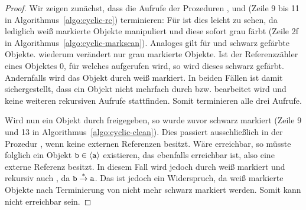 \begin{proof}
	Wir zeigen zunächst, dass die Aufrufe der Prozeduren ,  und  (Zeile 9 bis 11 in Algorithmus~\ref{algo:cyclic-rc}) terminieren:
	Für  ist dies leicht zu sehen, da  lediglich weiß markierte Objekte manipuliert und diese sofort grau färbt (Zeile 2f in Algorithmus~\ref{algo:cyclic-markscan}).
	Analoges gilt für  und schwarz gefärbte Objekte.
	 wiederum verändert nur grau markierte Objekte.
	Ist der Referenzzähler eines Objektes $0$, für welches  aufgerufen wird, so wird dieses schwarz gefärbt.
	Andernfalls wird das Objekt durch  weiß markiert.
	In beiden Fällen ist damit sichergestellt, dass ein Objekt nicht mehrfach durch  bzw.  bearbeitet wird und keine weiteren rekursiven Aufrufe stattfinden.
	Somit terminieren alle drei Aufrufe.
	
	Wird nun ein Objekt  durch  freigegeben, so wurde  zuvor schwarz markiert (Zeile 9 und 13 in Algorithmus~\ref{algo:cyclic-clean}).
	Dies passiert ausschließlich in der Prozedur , wenn  keine externen Referenzen besitzt.
	Wäre  erreichbar, so müsste folglich ein Objekt $\texttt{b} \in \left\langle\texttt{a}\right\rangle$ existieren, das ebenfalls erreichbar ist, also eine externe Referenz besitzt.
	In diesem Fall wird  jedoch durch  weiß markiert und rekursiv auch , da $\texttt{b} \overset{*}{\rightarrow} \texttt{a}$.
	Das ist jedoch ein Widerspruch, da weiß markierte Objekte nach Terminierung von  nicht mehr schwarz markiert werden.
	Somit kann  nicht erreichbar sein.
\end{proof}

